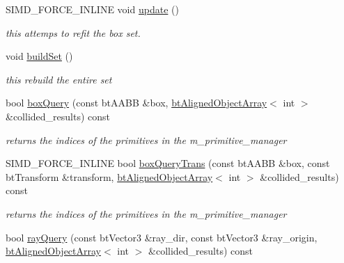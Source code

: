 \begin{DoxyCompactItemize}
\item 
S\+I\+M\+D\+\_\+\+F\+O\+R\+C\+E\+\_\+\+I\+N\+L\+I\+NE void \hyperlink{classbtGImpactBvh_ac0511b84c8722348fe4295b2a8f40c81}{update} ()
\begin{DoxyCompactList}\small\item\em this attemps to refit the box set. \end{DoxyCompactList}\item 
\mbox{\label{classbtGImpactBvh_a09c889dd33db157383fb5bdb17d58d51}} 
void \hyperlink{classbtGImpactBvh_a09c889dd33db157383fb5bdb17d58d51}{build\+Set} ()
\begin{DoxyCompactList}\small\item\em this rebuild the entire set \end{DoxyCompactList}\item 
\mbox{\label{classbtGImpactBvh_a3e3865462400694cc0c84504118a243c}} 
bool \hyperlink{classbtGImpactBvh_a3e3865462400694cc0c84504118a243c}{box\+Query} (const bt\+A\+A\+BB \&box, \hyperlink{classbtAlignedObjectArray}{bt\+Aligned\+Object\+Array}$<$ int $>$ \&collided\+\_\+results) const
\begin{DoxyCompactList}\small\item\em returns the indices of the primitives in the m\+\_\+primitive\+\_\+manager \end{DoxyCompactList}\item 
\mbox{\label{classbtGImpactBvh_a31469b332c989f80c88abba2a1e8ff2f}} 
S\+I\+M\+D\+\_\+\+F\+O\+R\+C\+E\+\_\+\+I\+N\+L\+I\+NE bool \hyperlink{classbtGImpactBvh_a31469b332c989f80c88abba2a1e8ff2f}{box\+Query\+Trans} (const bt\+A\+A\+BB \&box, const bt\+Transform \&transform, \hyperlink{classbtAlignedObjectArray}{bt\+Aligned\+Object\+Array}$<$ int $>$ \&collided\+\_\+results) const
\begin{DoxyCompactList}\small\item\em returns the indices of the primitives in the m\+\_\+primitive\+\_\+manager \end{DoxyCompactList}\item 
\mbox{\label{classbtGImpactBvh_ab704a23868c139007cd9bb0622297a1e}} 
bool \hyperlink{classbtGImpactBvh_ab704a23868c139007cd9bb0622297a1e}{ray\+Query} (const bt\+Vector3 \&ray\+\_\+dir, const bt\+Vector3 \&ray\+\_\+origin, \hyperlink{classbtAlignedObjectArray}{bt\+Aligned\+Object\+Array}$<$ int $>$ \&collided\+\_\+results) const

\end{DoxyCompactItemize}
